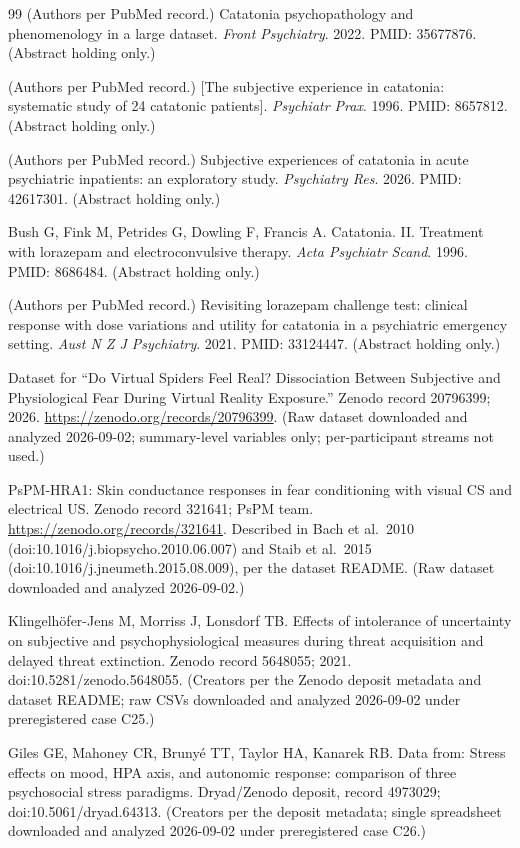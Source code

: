 \documentclass[9pt,twocolumn]{article}
\begin{document}
\begin{thebibliography}{99}
(Authors per PubMed record.) Catatonia psychopathology and phenomenology in a large dataset. \emph{Front Psychiatry}. 2022. PMID: 35677876. (Abstract holding only.)

(Authors per PubMed record.) [The subjective experience in catatonia: systematic study of 24 catatonic patients]. \emph{Psychiatr Prax}. 1996. PMID: 8657812. (Abstract holding only.)

(Authors per PubMed record.) Subjective experiences of catatonia in acute psychiatric inpatients: an exploratory study. \emph{Psychiatry Res}. 2026. PMID: 42617301. (Abstract holding only.)

Bush G, Fink M, Petrides G, Dowling F, Francis A. Catatonia. II. Treatment with lorazepam and electroconvulsive therapy. \emph{Acta Psychiatr Scand}. 1996. PMID: 8686484. (Abstract holding only.)

(Authors per PubMed record.) Revisiting lorazepam challenge test: clinical response with dose variations and utility for catatonia in a psychiatric emergency setting. \emph{Aust N Z J Psychiatry}. 2021. PMID: 33124447. (Abstract holding only.)

Dataset for ``Do Virtual Spiders Feel Real? Dissociation Between Subjective and Physiological Fear During Virtual Reality Exposure.'' Zenodo record 20796399; 2026. \url{https://zenodo.org/records/20796399}. (Raw dataset downloaded and analyzed 2026-09-02; summary-level variables only; per-participant streams not used.)

PsPM-HRA1: Skin conductance responses in fear conditioning with visual CS and electrical US. Zenodo record 321641; PsPM team. \url{https://zenodo.org/records/321641}. Described in Bach et al.\ 2010 (doi:10.1016/j.biopsycho.2010.06.007) and Staib et al.\ 2015 (doi:10.1016/j.jneumeth.2015.08.009), per the dataset README. (Raw dataset downloaded and analyzed 2026-09-02.)

Klingelh\"ofer-Jens M, Morriss J, Lonsdorf TB. Effects of intolerance of uncertainty on subjective and psychophysiological measures during threat acquisition and delayed threat extinction. Zenodo record 5648055; 2021. doi:10.5281/zenodo.5648055. (Creators per the Zenodo deposit metadata and dataset README; raw CSVs downloaded and analyzed 2026-09-02 under preregistered case C25.)

Giles GE, Mahoney CR, Bruny\'e TT, Taylor HA, Kanarek RB. Data from: Stress effects on mood, HPA axis, and autonomic response: comparison of three psychosocial stress paradigms. Dryad/Zenodo deposit, record 4973029; doi:10.5061/dryad.64313. (Creators per the deposit metadata; single spreadsheet downloaded and analyzed 2026-09-02 under preregistered case C26.)


\end{thebibliography}
\end{document}

